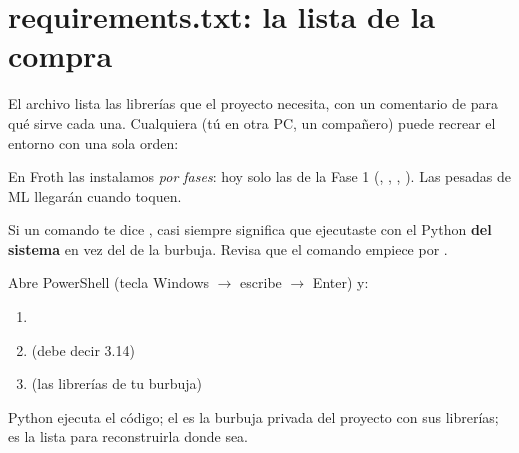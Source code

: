 \documentclass[11pt,a4paper]{article}
\begin{document}
\section{requirements.txt: la lista de la compra}

El archivo  lista las librerías que el proyecto necesita, con un
comentario de para qué sirve cada una. Cualquiera (tú en otra PC, un compañero) puede
recrear el entorno con una sola orden:
\begin{center}
\end{center}
En Froth las instalamos \emph{por fases}: hoy solo las de la Fase 1 (,
, , ). Las pesadas de ML llegarán cuando
toquen.

\begin{ojo}
Si un comando te dice , casi siempre
significa que ejecutaste con el Python \textbf{del sistema} en vez del de la burbuja.
Revisa que el comando empiece por .
\end{ojo}

\begin{practica}
Abre PowerShell (tecla Windows $\rightarrow$ escribe  $\rightarrow$ Enter) y:
\begin{enumerate}
  \item {}
  \item {} \quad (debe decir 3.14)
  \item {} \quad (las librerías de tu burbuja)
\end{enumerate}
\end{practica}

\begin{resumen}
Python ejecuta el código; el  es la burbuja privada del proyecto con sus
librerías;  es la lista para reconstruirla donde sea.
\end{resumen}
\end{document}

